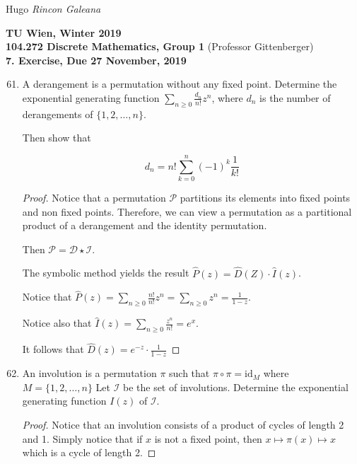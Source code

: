 \documentclass[12pt]{article}
\newcommand{\Term}{Winter 2019}
\newcommand{\Course}{104.272 Discrete Mathematics, Group 1}
\newcommand{\Assignment}{7. Exercise}
\newcommand{\DueDate}{ 27 November, 2019 }
\begin{document}
Hugo \textit{Rincon Galeana}
\begin{center}

\textbf{TU Wien, \Term} \\
\textbf{\Course} (Professor Gittenberger) \\
\textbf{\Assignment, Due \DueDate}
\end{center}


\begin{enumerate}
    \setcounter{enumi}{60}
    \item A derangement is a permutation without any fixed point. Determine the exponential generating function $\displaystyle\sum\limits_{n \geq 0} \frac{d_n}{n!} z^n$, where $d_n$ is the number of derangements of $\{1,2,\ldots,n\}$.
    
    Then show that
    
    $$d_n = n!\displaystyle\sum\limits_{k=0}^{n} (-1)^k \frac{1}{k!}$$
    
    \begin{proof}
    Notice that a permutation $\mathcal{P}$ partitions its elements into fixed points and non fixed points. Therefore, we can view a permutation as a partitional product of a derangement and the identity permutation.
    
    Then $\mathcal{P} = \mathcal{D} \star \mathcal{I}$.
    
    The symbolic method yields the result $\hat P(z) = \hat D(Z) \cdot \hat I (z)$.
    
    Notice that $\hat P(z) = \displaystyle \sum \limits_{n\geq 0} \frac{n!}{n!} z^n = \displaystyle \sum \limits_{n\geq 0} z^ n = \displaystyle\frac{1}{1-z}$. 
    
    Notice also that $\hat I(z) = \displaystyle \sum \limits_{n\geq 0} \frac{z^n}{n!} = e^x$.
    
    It follows that $\hat D(z) = e^{-z} \cdot \frac{1}{1-z}$
    \end{proof}
    
    \item An involution is a permutation $\pi$ such that $\pi \circ \pi = \textrm {id}_M$ where $M = \{1,2,\ldots, n\}$ Let $\mathcal I$ be the set of involutions. Determine the exponential generating function $I(z)$ of $\mathcal I$.
    
    \begin{proof}
        Notice that an involution consists of a product of cycles of length 2 and 1. Simply notice that if $x$ is not a fixed point, then $x \mapsto \pi(x) \mapsto x$ which is a cycle of length 2.
        

\end{proof}
\end{enumerate}
\end{document}
